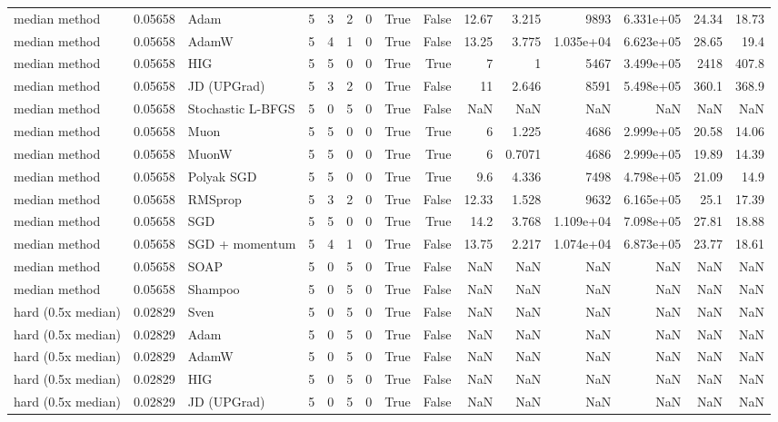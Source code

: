 \begin{tabular}{lrlrrrrrrrrrrrr}
median method & 0.05658 & Adam & 5 & 3 & 2 & 0 & True & False & 12.67 & 3.215 & 9893 & 6.331e+05 & 24.34 & 18.73 \\
median method & 0.05658 & AdamW & 5 & 4 & 1 & 0 & True & False & 13.25 & 3.775 & 1.035e+04 & 6.623e+05 & 28.65 & 19.4 \\
median method & 0.05658 & HIG & 5 & 5 & 0 & 0 & True & True & 7 & 1 & 5467 & 3.499e+05 & 2418 & 407.8 \\
median method & 0.05658 & JD (UPGrad) & 5 & 3 & 2 & 0 & True & False & 11 & 2.646 & 8591 & 5.498e+05 & 360.1 & 368.9 \\
median method & 0.05658 & Stochastic L-BFGS & 5 & 0 & 5 & 0 & True & False & NaN & NaN & NaN & NaN & NaN & NaN \\
median method & 0.05658 & Muon & 5 & 5 & 0 & 0 & True & True & 6 & 1.225 & 4686 & 2.999e+05 & 20.58 & 14.06 \\
median method & 0.05658 & MuonW & 5 & 5 & 0 & 0 & True & True & 6 & 0.7071 & 4686 & 2.999e+05 & 19.89 & 14.39 \\
median method & 0.05658 & Polyak SGD & 5 & 5 & 0 & 0 & True & True & 9.6 & 4.336 & 7498 & 4.798e+05 & 21.09 & 14.9 \\
median method & 0.05658 & RMSprop & 5 & 3 & 2 & 0 & True & False & 12.33 & 1.528 & 9632 & 6.165e+05 & 25.1 & 17.39 \\
median method & 0.05658 & SGD & 5 & 5 & 0 & 0 & True & True & 14.2 & 3.768 & 1.109e+04 & 7.098e+05 & 27.81 & 18.88 \\
median method & 0.05658 & SGD + momentum & 5 & 4 & 1 & 0 & True & False & 13.75 & 2.217 & 1.074e+04 & 6.873e+05 & 23.77 & 18.61 \\
median method & 0.05658 & SOAP & 5 & 0 & 5 & 0 & True & False & NaN & NaN & NaN & NaN & NaN & NaN \\
median method & 0.05658 & Shampoo & 5 & 0 & 5 & 0 & True & False & NaN & NaN & NaN & NaN & NaN & NaN \\
hard (0.5x median) & 0.02829 & Sven & 5 & 0 & 5 & 0 & True & False & NaN & NaN & NaN & NaN & NaN & NaN \\
hard (0.5x median) & 0.02829 & Adam & 5 & 0 & 5 & 0 & True & False & NaN & NaN & NaN & NaN & NaN & NaN \\
hard (0.5x median) & 0.02829 & AdamW & 5 & 0 & 5 & 0 & True & False & NaN & NaN & NaN & NaN & NaN & NaN \\
hard (0.5x median) & 0.02829 & HIG & 5 & 0 & 5 & 0 & True & False & NaN & NaN & NaN & NaN & NaN & NaN \\
hard (0.5x median) & 0.02829 & JD (UPGrad) & 5 & 0 & 5 & 0 & True & False & NaN & NaN & NaN & NaN & NaN & NaN \\

\end{tabular}
